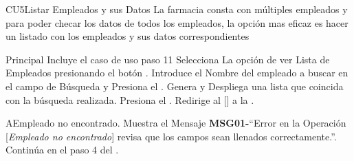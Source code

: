 \begin{UseCase}{CU5}{Listar Empleados y sus Datos}{
		La farmacia consta con múltiples empleados y para poder checar los datos de todos los empleados, la opción mas eficaz es hacer un listado con los empleados y sus datos correspondientes
	}
	\end{UseCase}
	\begin{UCtrayectoria}{Principal}
		\UCpaso Incluye el caso de uso  paso 11
		\UCpaso[\UCactor] Selecciona La opción de ver Lista de  Empleados presionando el botón .
		\UCpaso[\UCactor] Introduce el Nombre del empleado a buscar en el campo de Búsqueda y Presiona el .
		\UCpaso Genera y Despliega una lista que coincida con la búsqueda realizada.  
		\UCpaso [\UCactor] Presiona el .
		\UCpaso Redirige al [\UCactor] a la  .
	\end{UCtrayectoria}


\begin{UCtrayectoriaA}{A}{Empleado no encontrado.}
			\UCpaso Muestra el Mensaje {\bf MSG01-}``Error en la Operación [{\em Empleado no encontrado}] revisa que los campos sean llenados correctamente.''.
			\UCpaso Continúa en el paso 4 del .
		\end{UCtrayectoriaA}
